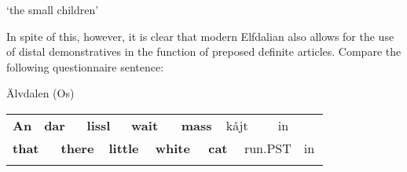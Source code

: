 \begin{styleTranslation}
‘the small children’

\end{styleTranslation}

\begin{styleBodyTextFirst}
In spite of this, however, it is clear that modern Elfdalian also allows for the use of distal demonstratives in the function of preposed definite articles. Compare the following questionnaire sentence:

\end{styleBodyTextFirst}


\begin{listWWNumileveli}
\item 

\begin{styleExample}
Älvdalen (Os)

\end{styleExample}

\end{listWWNumileveli}

\begin{tabular}{llllllllllllll}
\lsptoprule
{\bfseries An} & \multicolumn{2}{l}{{\bfseries dar}

} & \multicolumn{2}{l}{{\bfseries lissl}

} & \multicolumn{2}{l}{{\bfseries wait}

} & \multicolumn{2}{l}{{\bfseries mass}

} & \multicolumn{2}{l}{kåjt

} & \multicolumn{2}{l}{in

} & \\
\multicolumn{2}{l}{{\bfseries that}

} & \multicolumn{2}{l}{{\bfseries there}

} & \multicolumn{2}{l}{{\bfseries little}

} & \multicolumn{2}{l}{{\bfseries white}

} & \multicolumn{2}{l}{{\bfseries cat}

} & \multicolumn{2}{l}{run.PST

} & \multicolumn{2}{l}{in

}\\
\lspbottomrule
\end{tabular}

